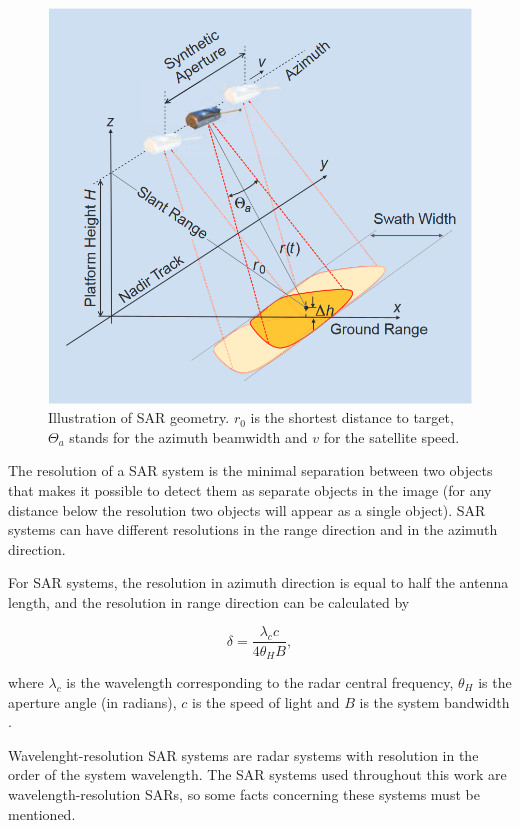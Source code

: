 \begin{figure}[H]
    \centering
    \includegraphics[width=0.8\linewidth]{Cap1-Bib-Review/geometry.png}
    \caption{Illustration of SAR geometry. $r_0$ is the shortest distance to target, $\Theta_a$ stands for the azimuth beamwidth and $v$ for the satellite speed. \cite{tutorial}}
    \label{fig:SAR_geometry}
\end{figure}{}

The resolution of a SAR system is the minimal separation between two objects that makes it possible to detect them as separate objects in the image (for any distance below the resolution two objects will appear as a single object). SAR systems can have different resolutions in the range direction and in the azimuth direction.

For SAR systems, the resolution in azimuth direction is equal to half the antenna length, and the resolution in range direction can be calculated by

\begin{equation}
    \delta = \frac{\lambda_c c}{4 \theta_H B},
\end{equation}

\noindent
where $\lambda_c$ is the wavelength corresponding to the radar central frequency, $\theta_H$
is the aperture angle (in radians), $c$ is the speed of light and $B$ is the system bandwidth \cite{62}.

Wavelenght-resolution SAR systems are radar systems with resolution in the order of the system wavelength. The SAR systems used throughout this work are wavelength-resolution SARs, so some facts concerning these systems must be mentioned. 

